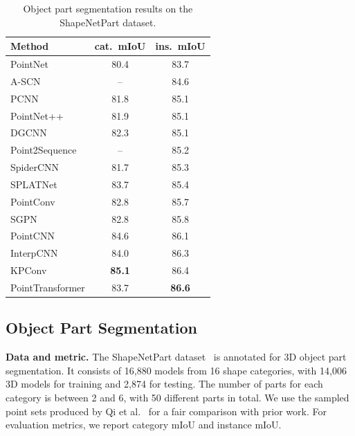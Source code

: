 \begin{table}[t]
	\centering
	\begin{tabular}{ l | c c}
		\toprule[1pt]
		Method & cat.\ mIoU & ins.\ mIoU \\
		\hline
		PointNet~\cite{qi2017pointnet} & 80.4 & 83.7 \\
		A-SCN~\cite{xie2018attentional} & -- & 84.6 \\
		PCNN~\cite{wang2018pccn} & 81.8 & 85.1 \\
		PointNet++~\cite{qi2017pointnet2} & 81.9 & 85.1 \\
		DGCNN~\cite{wang2019dgcnn} & 82.3 & 85.1 \\
		Point2Sequence~\cite{liu2019point2sequence} & -- & 85.2 \\
		SpiderCNN~\cite{xu2018spidercnn}& 81.7 & 85.3 \\
		SPLATNet~\cite{su2018splatnet} & 83.7 & 85.4 \\
		PointConv~\cite{wu2019pointconv} & 82.8 & 85.7 \\
		SGPN~\cite{wang2018sgpn} & 82.8 & 85.8 \\
		PointCNN~\cite{li2018pointcnn} & 84.6 & 86.1 \\
		InterpCNN~\cite{mao2019interpolated} & 84.0 & 86.3 \\
		KPConv~\cite{thomas2019kpconv} & \textbf{85.1} & 86.4 \\
		\hline
		PointTransformer & 83.7 & \textbf{86.6} \\
		\bottomrule[1pt]
	\end{tabular}
	\caption{Object part segmentation results on the ShapeNetPart dataset.}
	\label{tab:shapenetpartresult}
	\vspace{-2mm}
\end{table}

\subsection{Object Part Segmentation}

\noindent\textbf{Data and metric.}
The ShapeNetPart dataset~\cite{yi2016scalable} is annotated for 3D object part segmentation. It consists of 16,880 models from 16 shape categories, with 14,006 3D models for training and 2,874 for testing. The number of parts for each category is between 2 and 6, with 50 different parts in total.
We use the sampled point sets produced by Qi et al.~\cite{qi2017pointnet2} for a fair comparison with prior work. For evaluation metrics, we report category mIoU and instance mIoU.

